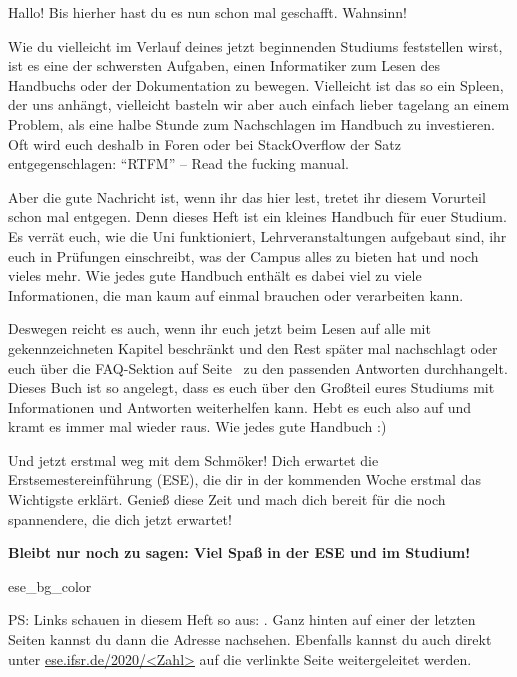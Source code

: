 

Hallo! Bis hierher hast du es nun schon mal geschafft. Wahnsinn!

Wie du vielleicht im Verlauf deines jetzt beginnenden Studiums feststellen wirst, ist es eine der schwersten Aufgaben, einen Informatiker zum Lesen des Handbuchs oder der Dokumentation zu bewegen. Vielleicht ist das so ein Spleen, der uns anhängt, vielleicht basteln wir aber auch einfach lieber tagelang an einem Problem, als eine halbe Stunde zum Nachschlagen im Handbuch zu investieren.
Oft wird euch deshalb in Foren oder bei StackOverflow der Satz entgegenschlagen: \enquote{RTFM} -- Read the fucking manual.

Aber die gute Nachricht ist, wenn ihr das hier lest, tretet ihr diesem Vorurteil schon mal entgegen. Denn dieses Heft ist ein kleines Handbuch für euer Studium.
Es verrät euch, wie die Uni funktioniert, Lehrveranstaltungen aufgebaut sind, ihr euch in Prüfungen einschreibt, was der Campus alles zu bieten hat und noch vieles mehr.
Wie jedes gute Handbuch enthält es dabei viel zu viele Informationen, die man kaum auf einmal brauchen oder verarbeiten kann.

Deswegen reicht es auch, wenn ihr euch jetzt beim Lesen auf alle mit  gekennzeichneten Kapitel beschränkt und den Rest später mal nachschlagt oder euch über die FAQ-Sektion auf Seite~\pageref{sec:faq} zu den passenden Antworten durchhangelt.
Dieses Buch ist so angelegt, dass es euch über den Großteil eures Studiums mit Informationen und Antworten weiterhelfen kann. Hebt es euch also auf und kramt es immer mal wieder raus. Wie jedes gute Handbuch :)

Und jetzt erstmal weg mit dem Schmöker! Dich erwartet die Erstsemestereinführung (ESE), die dir in der kommenden Woche erstmal das Wichtigste erklärt.
Genieß diese Zeit und mach dich bereit für die noch spannendere, die dich jetzt erwartet!

\textbf{Bleibt nur noch zu sagen: Viel Spaß in der ESE und im Studium!}


\bigskip
\begin{awesomeblock}{2pt}{\faLightbulb[regular]}{ese_bg_color}
    \begin{minipage}[t]{.82\textwidth}
\small PS\@: Links schauen in diesem Heft so aus: . Ganz hinten auf einer der letzten Seiten kannst du dann die Adresse nachsehen. Ebenfalls kannst du auch direkt unter \url{ese.ifsr.de/2020/<Zahl>} auf die verlinkte Seite weitergeleitet werden.
    \end{minipage}
\end{awesomeblock}
